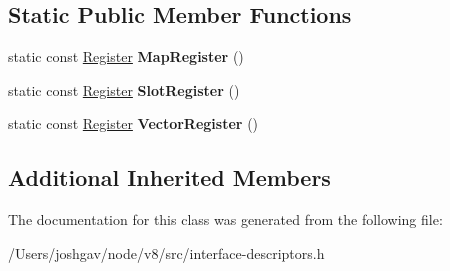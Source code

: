 \subsection*{Static Public Member Functions}
\begin{DoxyCompactItemize}
\item 
static const \hyperlink{structv8_1_1internal_1_1_register}{Register} {\bfseries Map\+Register} ()\hypertarget{classv8_1_1internal_1_1_vector_store_transition_descriptor_afe0ac1187eef8a76a30553ae57536d30}{}\label{classv8_1_1internal_1_1_vector_store_transition_descriptor_afe0ac1187eef8a76a30553ae57536d30}

\item 
static const \hyperlink{structv8_1_1internal_1_1_register}{Register} {\bfseries Slot\+Register} ()\hypertarget{classv8_1_1internal_1_1_vector_store_transition_descriptor_afe890b96e91fc99969c170f3f818d330}{}\label{classv8_1_1internal_1_1_vector_store_transition_descriptor_afe890b96e91fc99969c170f3f818d330}

\item 
static const \hyperlink{structv8_1_1internal_1_1_register}{Register} {\bfseries Vector\+Register} ()\hypertarget{classv8_1_1internal_1_1_vector_store_transition_descriptor_a4a24b3a78fb024cbf65fc826352bdf6d}{}\label{classv8_1_1internal_1_1_vector_store_transition_descriptor_a4a24b3a78fb024cbf65fc826352bdf6d}

\end{DoxyCompactItemize}
\subsection*{Additional Inherited Members}


The documentation for this class was generated from the following file\+:\begin{DoxyCompactItemize}
\item 
/\+Users/joshgav/node/v8/src/interface-\/descriptors.\+h\end{DoxyCompactItemize}
